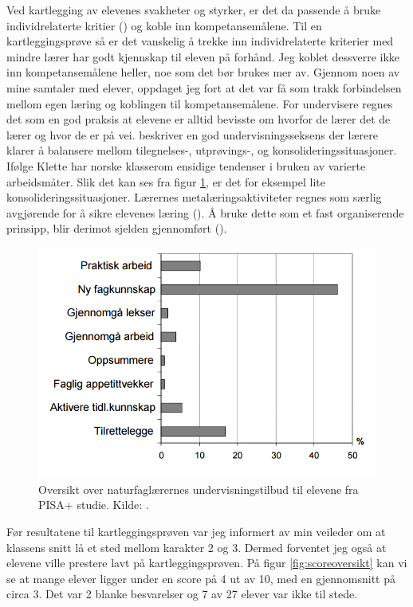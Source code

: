 \documentclass[main.tex]{subfiles}
\begin{document}
Ved kartlegging av elevenes svakheter og styrker, er det da passende å bruke
individrelaterte kritier () og koble inn kompetansemålene. Til en kartleggingsprøve så er det 
vanskelig å trekke inn individrelaterte kriterier med mindre lærer har godt kjennskap til eleven på forhånd. Jeg 
koblet dessverre ikke inn kompetansemålene heller, noe som det bør brukes mer av. Gjennom noen av mine samtaler 
med elever, oppdaget jeg fort at det var få som trakk forbindelsen mellom egen læring og koblingen til kompetansemålene. 
For undervisere regnes det som en god praksis at elevene er alltid bevisste om hvorfor de lærer det de lærer og hvor 
de er på vei.  beskriver en god undervisningsseksens der lærere klarer å balansere mellom 
tilegnelses-, utprøvings-, og konsolideringssituasjoner. Ifølge Klette har norske klasserom ensidige tendenser i bruken 
av varierte arbeidsmåter. Slik det kan ses fra figur \ref{fig:odeg10}, er det for eksempel lite 
konsolideringssituasjoner. Lærernes metalæringsaktiviteter regnes som særlig avgjørende for å sikre elevenes læring 
(). Å bruke dette som et fast organiserende prinsipp, blir derimot sjelden gjennomført 
().
\begin{figure}[h!]
\includegraphics[scale = 0.6]{../figures/undervisnings_aktivitet.png}
\caption{Oversikt over naturfaglærernes undervisningstilbud til elevene fra PISA+ studie. Kilde: 
\protect{}.}
\label{fig:odeg10}
\end{figure}
\newline

Før resultatene til kartleggingsprøven var jeg informert av min veileder om at klassens snitt lå et sted mellom
karakter 2 og 3. Dermed forventet jeg også at elevene ville prestere lavt på kartleggingsprøven. På figur 
\ref{fig:scoreoversikt} kan vi se at mange elever ligger under en score på 4 ut av 10, med en gjennomsnitt 
på circa 3. Det var 2 blanke besvarelser og 7 av 27 elever var ikke til stede.
\end{document}
